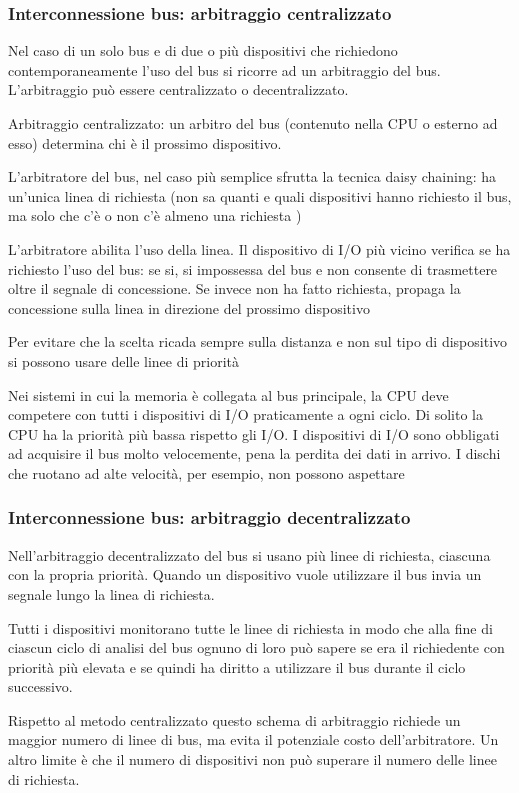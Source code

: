 \documentclass[12pt]{article} %
\begin{document}
\subsubsection{Interconnessione bus: arbitraggio centralizzato}
Nel caso di un solo bus e di due o più dispositivi che richiedono contemporaneamente l'uso del bus si ricorre ad un arbitraggio del bus. L'arbitraggio può essere centralizzato o decentralizzato.\par\medskip\noindent
Arbitraggio centralizzato: un arbitro del bus (contenuto nella CPU o esterno ad esso) determina chi è il prossimo dispositivo.\par\medskip\noindent
L'arbitratore del bus, nel caso più semplice sfrutta la tecnica daisy chaining: ha un’unica linea di richiesta (non sa quanti e quali dispositivi hanno richiesto il bus, ma solo che c'è o non c'è almeno una richiesta )\par\medskip\noindent
L'arbitratore abilita l'uso della linea. Il dispositivo di I/O più vicino verifica se ha richiesto l'uso del bus: se si, si impossessa del bus e non consente di trasmettere oltre il segnale di concessione. Se invece non ha fatto richiesta, propaga la concessione sulla linea in direzione del
prossimo dispositivo\par\medskip\noindent
Per evitare che la scelta ricada sempre sulla distanza e non sul tipo di dispositivo si possono usare delle linee di priorità\par\medskip\noindent
Nei sistemi in cui la memoria è collegata al bus principale, la CPU deve competere con tutti i dispositivi di I/O praticamente a ogni ciclo. Di solito la CPU ha la priorità più bassa rispetto gli I/O. I dispositivi di I/O sono obbligati ad acquisire il bus molto velocemente, pena la perdita dei dati in arrivo. I dischi che ruotano ad alte velocità, per esempio, non possono aspettare\par\medskip\noindent
\subsubsection{Interconnessione bus: arbitraggio decentralizzato}
Nell'arbitraggio decentralizzato del bus si usano più linee di richiesta, ciascuna con la
propria priorità. Quando un dispositivo vuole utilizzare il bus invia un segnale lungo la linea di richiesta.\par\medskip\noindent
Tutti i dispositivi monitorano tutte le linee di richiesta in modo che alla fine di ciascun ciclo di analisi del bus ognuno di loro può sapere se era il richiedente con priorità più elevata e se quindi ha diritto a utilizzare il bus durante il ciclo successivo. \par\medskip\noindent
Rispetto al metodo centralizzato questo schema di arbitraggio richiede un maggior numero di linee di bus, ma evita il potenziale costo dell’arbitratore. Un altro limite è che il numero di dispositivi non può superare il numero delle linee di richiesta.
\newpage
\end{document}
